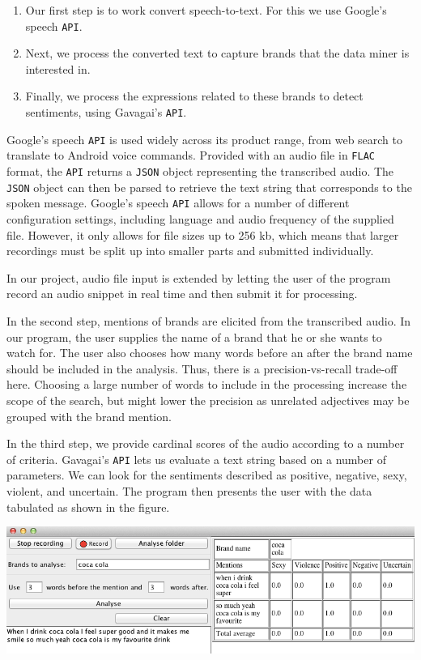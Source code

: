\documentclass[a4paper,12pt,twoside]{ltxdoc}
\begin{document}
\begin{enumerate}
\item Our first step is to work convert speech-to-text. For this we use Google's speech \verb#API#.

\item Next, we process the converted text to capture brands that the data miner is interested in.

\item Finally, we process the expressions related to these brands to detect sentiments, using Gavagai's \verb#API#.
\end{enumerate}

Google's speech \verb#API# is used widely across its product range, from web search to translate to Android voice commands.
Provided with an audio file in \verb#FLAC# format, the \verb#API# returns a \verb#JSON# object representing the transcribed audio. The \verb#JSON# object
can then be parsed to retrieve the text string that corresponds to the spoken message. Google's speech \verb#API# allows for a number
of different configuration settings, including language and audio frequency of the supplied file. However, it only allows for file sizes up to 256 kb, 
which means that larger recordings must be split up into smaller parts and submitted individually.

In our project, audio file input is extended by letting the user of the program record an audio snippet in real time and
then submit it for processing.

In the second step, mentions of brands are elicited from the transcribed audio. In our program, the user supplies the name
of a brand that he or she wants to watch for. The user also chooses how many words before an after the brand name should
be included in the analysis. Thus, there is a precision-vs-recall trade-off here. Choosing a large number of words to include
in the processing increase the scope of the search, but might lower the precision as unrelated adjectives may be grouped
with the brand mention.

In the third step, we provide cardinal scores of the audio according to a number of criteria. Gavagai's \verb#API# lets us
evaluate a text string based on a number of parameters. We can look for the sentiments described as positive, negative, sexy, violent,
and uncertain. The program then presents the user with the data tabulated as shown in the figure. %

\begin{center}
\includegraphics[scale=0.6]{../poster/screenshot_crop.png}
\end{center}
\end{document}
